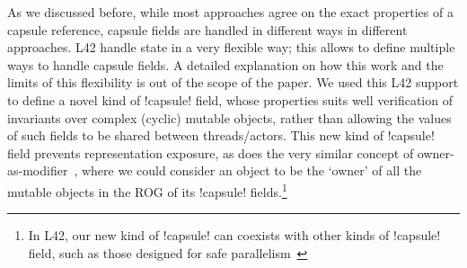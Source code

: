 

As we discussed before, while most approaches agree on the exact properties of a capsule reference,
capsule fields are handled in different ways in different approaches. L42 handle state in a very flexible way; this allows to define multiple ways to handle capsule fields. A detailed explanation on how this work and the limits of this flexibility is out of the scope of the paper.
We used this L42 support to define a novel kind of \Q!capsule! field,
whose properties suits well verification of invariants over complex (cyclic) mutable objects,
rather than allowing the values of such fields to be shared between threads/actors.
This new kind of \Q!capsule! field prevents representation exposure, as does the very similar concept of owner-as-modifier~\cite{Dietl05universes:lightweight,10.1007/978-3-540-92188-2_4}, where we could consider an object to be the `owner' of all the mutable objects in the ROG of its \Q!capsule! fields.\footnote{In L42, our new kind of \Q!capsule! can coexists with other kinds of \Q!capsule! field, such as those designed for safe parallelism~\cite{GordonEtAl12,clebsch2015deny,GIANNINI2019145}}





